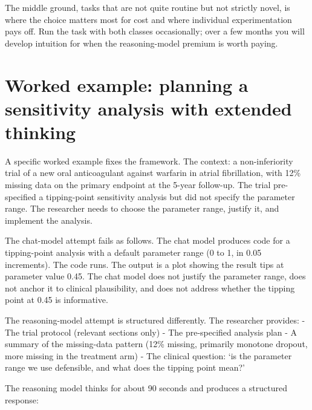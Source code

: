 \documentclass[
  letterpaper,
  11pt]{scrbook}
\begin{document}
The middle ground, tasks that are not quite routine but not strictly
novel, is where the choice matters most for cost and where individual
experimentation pays off. Run the task with both classes occasionally;
over a few months you will develop intuition for when the
reasoning-model premium is worth paying.

\section{Worked example: planning a sensitivity analysis with extended
thinking}\label{worked-example-planning-a-sensitivity-analysis-with-extended-thinking}

A specific worked example fixes the framework. The context: a
non-inferiority trial of a new oral anticoagulant against warfarin in
atrial fibrillation, with 12\% missing data on the primary endpoint at
the 5-year follow-up. The trial pre-specified a tipping-point
sensitivity analysis but did not specify the parameter range. The
researcher needs to choose the parameter range, justify it, and
implement the analysis.

The chat-model attempt fails as follows. The chat model produces code
for a tipping-point analysis with a default parameter range (0 to 1, in
0.05 increments). The code runs. The output is a plot showing the result
tips at parameter value 0.45. The chat model does not justify the
parameter range, does not anchor it to clinical plausibility, and does
not address whether the tipping point at 0.45 is informative.

The reasoning-model attempt is structured differently. The researcher
provides: - The trial protocol (relevant sections only) - The
pre-specified analysis plan - A summary of the missing-data pattern
(12\% missing, primarily monotone dropout, more missing in the treatment
arm) - The clinical question: `is the parameter range we use defensible,
and what does the tipping point mean?'

The reasoning model thinks for about 90 seconds and produces a
structured response:
\end{document}
